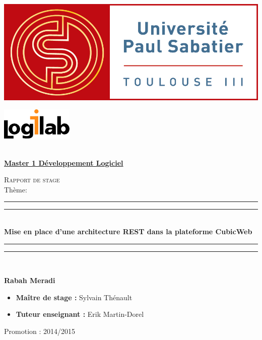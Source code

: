 \thispagestyle{empty}

\begin{center}
\begin{minipage}[t]{0.5\textwidth}
  \begin{flushleft}
    \includegraphics [scale=.4]{images/upslogo.jpg} \\[0.5cm]
  \end{flushleft}
\end{minipage}
\begin{minipage}[t]{0.48\textwidth}
  \begin{flushright}
    \includegraphics {images/logilablogo.png} \\[0.5cm]		
  \end{flushright}
\end{minipage} \\[1.5cm]

\textbf{\underline{\large Master 1 Développement Logiciel}}

\vspace{5em}

\textsc{\Large Rapport de stage}\\[0.5cm]
\vspace{2em}
Thème:
\rule{\textwidth}{1.6pt}\vspace*{-\baselineskip}\vspace*{2pt}
\rule{\textwidth}{0.4pt}\\
\LARGE
\textbf{Mise en place d'une architecture REST dans la plateforme CubicWeb}\\
\rule{\textwidth}{0.4pt}\vspace*{-\baselineskip}\vspace{3.2pt}
\rule{\textwidth}{1.6pt}\\[\baselineskip]

\vspace{2em}

\textbf{Rabah Meradi}

\vspace{1em}
\end{center}

\normalsize
\begin{itemize}
\setlength\itemsep{0.2em}
\item [] \textbf{Maître de stage :} Sylvain Thénault
\item [] \textbf{Tuteur enseignant :} Erik Martin-Dorel
\end{itemize}


\vspace*{\fill}
\begin{center}
	{\normalsize Promotion : 2014/2015}
\end{center}
